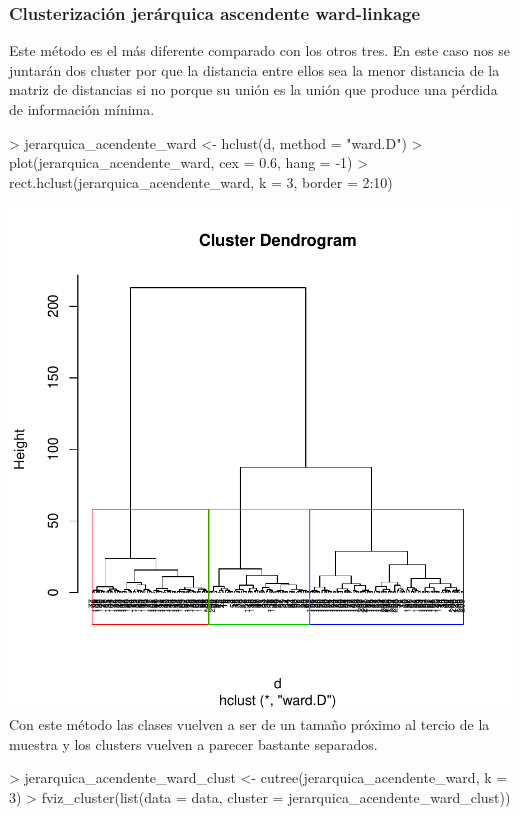 \documentclass [a4paper] {article}
\begin{document}
\subsubsection{Clusterización jerárquica ascendente ward-linkage}
Este método es el más diferente comparado con los otros tres.
En este caso nos se juntarán dos cluster por que la distancia entre ellos sea la menor distancia de la matriz de distancias si no
porque su unión es la unión que produce una pérdida de información mínima.
\begin{center}
\begin{Schunk}
\begin{Sinput}
> jerarquica_acendente_ward <- hclust(d, method = "ward.D")
> plot(jerarquica_acendente_ward, cex = 0.6, hang = -1)
> rect.hclust(jerarquica_acendente_ward, k = 3, border = 2:10)
\end{Sinput}
\end{Schunk}
\includegraphics{entrega-jerarquica_acendente_ward}
Con este método las clases vuelven a ser de un tamaño próximo al tercio de la muestra y los clusters vuelven a parecer bastante separados.
\begin{Schunk}
\begin{Sinput}
> jerarquica_acendente_ward_clust <- cutree(jerarquica_acendente_ward, k = 3)
> fviz_cluster(list(data = data, cluster = jerarquica_acendente_ward_clust))

\end{Sinput}
\end{Schunk}
\end{center}
\end{document}
